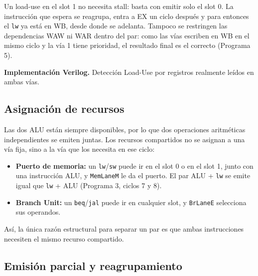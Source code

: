 \documentclass[12pt,a4paper]{article}
\begin{document}
Un load-use en el slot 1 no necesita stall: basta con emitir solo el slot 0. La instrucción que espera se reagrupa, entra a EX un ciclo después y para entonces el \texttt{lw} ya está en WB, desde donde se adelanta. Tampoco se restringen las dependencias WAW ni WAR dentro del par: como las vías escriben en WB en el mismo ciclo y la vía 1 tiene prioridad, el resultado final es el correcto (Programa 5).


\begin{samepage}
\noindent\textbf{Implementación Verilog.} Detección Load-Use por registros realmente leídos en ambas vías.
\end{samepage}


\subsection{Asignación de recursos}

Las dos ALU están siempre disponibles, por lo que dos operaciones aritméticas independientes se emiten juntas. Los recursos compartidos no se asignan a una vía fija, sino a la vía que los necesita en ese ciclo:

\begin{itemize}
    \item \textbf{Puerto de memoria:} un \texttt{lw}/\texttt{sw} puede ir en el slot 0 o en el slot 1, junto con una instrucción ALU, y \texttt{MemLaneM} le da el puerto. El par ALU + \texttt{lw} se emite igual que \texttt{lw} + ALU (Programa 3, ciclos 7 y 8).
    \item \textbf{Branch Unit:} un \texttt{beq}/\texttt{jal} puede ir en cualquier slot, y \texttt{BrLaneE} selecciona sus operandos.
\end{itemize}

\noindent Así, la única razón estructural para separar un par es que ambas instrucciones necesiten el mismo recurso compartido.

\subsection{Emisión parcial y reagrupamiento}
\end{document}
